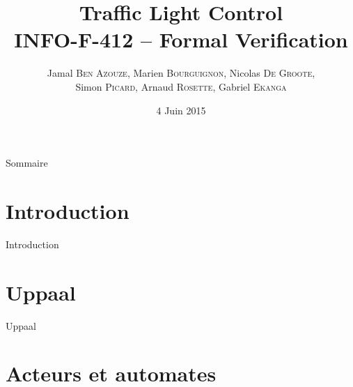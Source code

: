 \documentclass{bredelebeamer}
\begin{document}
\title[INFO-F-412 - Traffic Light Control]{\textbf{Traffic Light Control} \\INFO-F-412 -- Formal Verification} %

\author{Jamal \textsc{Ben Azouze}, Marien \textsc{Bourguignon}, Nicolas \textsc{De Groote}, \\Simon \textsc{Picard}, Arnaud \textsc{Rosette}, Gabriel \textsc{Ekanga}}
\date{4 Juin 2015} %

\begin{frame}
\titlepage %
\end{frame}

\begin{frame}{Sommaire}
\tableofcontents %
\end{frame}

\section{Introduction}
\begin{frame}{Introduction}

\end{frame}

\section{Uppaal}
\begin{frame}{Uppaal}

\end{frame}

\section{Acteurs et automates}
\end{document}
